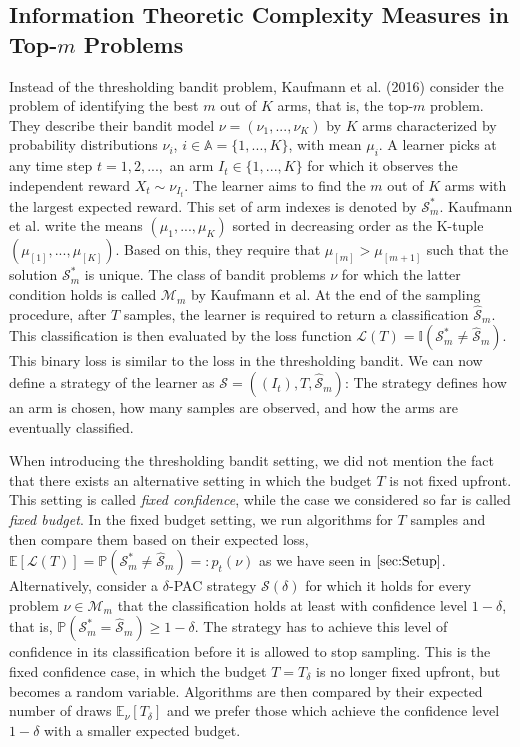 \documentclass[11pt,]{article}
\begin{document}
\subsection{\texorpdfstring{Information Theoretic Complexity Measures in
Top-\(m\) Problems
\label{sec:KaufmannEtAl2016}}{Information Theoretic Complexity Measures in Top-m Problems }}\label{information-theoretic-complexity-measures-in-top-m-problems}

Instead of the thresholding bandit problem, Kaufmann et al. (2016)
consider the problem of identifying the best \(m\) out of \(K\) arms,
that is, the top-\(m\) problem. They describe their bandit model
\(\nu = (\nu_1,...,\nu_K)\) by \(K\) arms characterized by probability
distributions \(\nu_i\), \(i \in \mathbb{A} = \{1,...,K\}\), with mean
\(\mu_i\). A learner picks at any time step \(t=1,2,...,\) an arm
\(I_t \in \{1,...,K\}\) for which it observes the independent reward
\(X_{t} \sim \nu_{I_t}\). The learner aims to find the \(m\) out of
\(K\) arms with the largest expected reward. This set of arm indexes is
denoted by \(\mathcal{S}_m^*\). Kaufmann et al. write the means
\((\mu_{1}, ..., \mu_{K})\) sorted in decreasing order as the K-tuple
\((\mu_{[1]}, ..., \mu_{[K]})\). Based on this, they require that
\(\mu_{[m]} > \mu_{[m+1]}\) such that the solution \(\mathcal{S}_m^*\)
is unique. The class of bandit problems \(\nu\) for which the latter
condition holds is called \(\mathcal{M}_m\) by Kaufmann et al. At the
end of the sampling procedure, after \(T\) samples, the learner is
required to return a classification \(\hat{\mathcal{S}}_m\). This
classification is then evaluated by the loss function
\(\mathcal{L}(T) = \mathbb{I}(\mathcal{S}^*_m \neq \hat{\mathcal{S}}_m)\).
This binary loss is similar to the loss in the thresholding bandit. We
can now define a strategy of the learner as
\(\mathcal{S} = ((I_t), T, \hat{\mathcal{S}}_m)\): The strategy defines
how an arm is chosen, how many samples are observed, and how the arms
are eventually classified.

When introducing the thresholding bandit setting, we did not mention the
fact that there exists an alternative setting in which the budget \(T\)
is not fixed upfront. This setting is called \emph{fixed confidence},
while the case we considered so far is called \emph{fixed budget}. In
the fixed budget setting, we run algorithms for \(T\) samples and then
compare them based on their expected loss,
\(\mathbb{E}[\mathcal{L}(T)] = \mathbb{P}(\mathcal{S}^*_m \neq \hat{\mathcal{S}}_m) =: p_t(\nu)\)
as we have seen in \(\autoref{sec:Setup}\). Alternatively, consider a
\(\delta\)-PAC strategy \(\mathcal{S}(\delta)\) for which it holds for
every problem \(\nu \in \mathcal{M}_m\) that the classification holds at
least with confidence level \(1-\delta\), that is,
\(\mathbb{P}(\mathcal{S}^*_m = \hat{\mathcal{S}}_m) \geq 1-\delta\). The
strategy has to achieve this level of confidence in its classification
before it is allowed to stop sampling. This is the fixed confidence
case, in which the budget \(T=T_{\delta}\) is no longer fixed upfront,
but becomes a random variable. Algorithms are then compared by their
expected number of draws \(\mathbb{E}_{\nu}[T_{\delta}]\) and we prefer
those which achieve the confidence level \(1-\delta\) with a smaller
expected budget.
\end{document}
